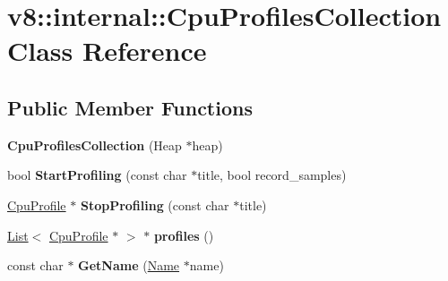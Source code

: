 \hypertarget{classv8_1_1internal_1_1_cpu_profiles_collection}{}\section{v8\+:\+:internal\+:\+:Cpu\+Profiles\+Collection Class Reference}
\label{classv8_1_1internal_1_1_cpu_profiles_collection}
\subsection*{Public Member Functions}
\begin{DoxyCompactItemize}
\item 
\hypertarget{classv8_1_1internal_1_1_cpu_profiles_collection_a61625974306812831897143ea5dc3e0e}{}{\bfseries Cpu\+Profiles\+Collection} (Heap $\ast$heap)\label{classv8_1_1internal_1_1_cpu_profiles_collection_a61625974306812831897143ea5dc3e0e}

\item 
\hypertarget{classv8_1_1internal_1_1_cpu_profiles_collection_a3b3d660ce79d37aba5ba7479d2f03f2b}{}bool {\bfseries Start\+Profiling} (const char $\ast$title, bool record\+\_\+samples)\label{classv8_1_1internal_1_1_cpu_profiles_collection_a3b3d660ce79d37aba5ba7479d2f03f2b}

\item 
\hypertarget{classv8_1_1internal_1_1_cpu_profiles_collection_ae11f54582389f8e972760151438df330}{}\hyperlink{classv8_1_1internal_1_1_cpu_profile}{Cpu\+Profile} $\ast$ {\bfseries Stop\+Profiling} (const char $\ast$title)\label{classv8_1_1internal_1_1_cpu_profiles_collection_ae11f54582389f8e972760151438df330}

\item 
\hypertarget{classv8_1_1internal_1_1_cpu_profiles_collection_a891193b036afc4dd4f032fa4088b9916}{}\hyperlink{classv8_1_1internal_1_1_list}{List}$<$ \hyperlink{classv8_1_1internal_1_1_cpu_profile}{Cpu\+Profile} $\ast$ $>$ $\ast$ {\bfseries profiles} ()\label{classv8_1_1internal_1_1_cpu_profiles_collection_a891193b036afc4dd4f032fa4088b9916}

\item 
\hypertarget{classv8_1_1internal_1_1_cpu_profiles_collection_a3013fbd52896673bb93ec1ed8f5a4e01}{}const char $\ast$ {\bfseries Get\+Name} (\hyperlink{classv8_1_1internal_1_1_name}{Name} $\ast$name)\label{classv8_1_1internal_1_1_cpu_profiles_collection_a3013fbd52896673bb93ec1ed8f5a4e01}


\end{DoxyCompactItemize}

